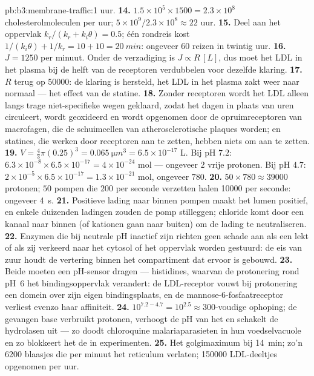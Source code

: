 \begin{solution}{pb:b3:membrane-traffic:1}
uur.
\textbf{14.} $1.5\times 10^{5}\times 1500 = 2.3\times 10^{8}$
cholesterolmoleculen per uur; $5\times 10^{9}/2.3\times 10^{8} \approx 22$ uur.
\textbf{15.} Deel aan het oppervlak $k_{r}/(k_{r} + k_{i}\theta) = 0.5$; één
rondreis kost $1/(k_{i}\theta) + 1/k_{r} = 10 + 10 = \qty{20}{min}$:
ongeveer $60$ reizen in twintig uur.
\textbf{16.} $J = 1250$ per minuut. Onder de verzadiging is $J \propto R\,[L]$,
dus moet het LDL in het plasma bij de helft van de receptoren
verdubbelen voor dezelfde klaring.
\textbf{17.} $R$ terug op \num{50000}: de klaring is hersteld, het LDL in
het plasma zakt weer naar normaal --- het effect van de statine.
\textbf{18.} Zonder receptoren wordt het LDL alleen langs trage
niet-specifieke wegen geklaard, zodat het dagen in plaats van uren
circuleert, wordt geoxideerd en wordt opgenomen door de
opruimreceptoren van macrofagen, die de schuimcellen van
atherosclerotische plaques worden; en statines, die werken door
receptoren aan te zetten, hebben niets om aan te zetten.
\textbf{19.} $V = \tfrac{4}{3}\pi(0.25)^{3} = \qty{0.065}{\micro m^3} =
6.5\times 10^{-17}$ L. Bij pH $7.2$: $6.3\times 10^{-8}\times 6.5\times
10^{-17} = 4\times 10^{-24}$ mol --- ongeveer $2$ vrije protonen. Bij pH $4.7$:
$2\times 10^{-5}\times 6.5\times 10^{-17} = 1.3\times 10^{-21}$ mol,
ongeveer $780$.
\textbf{20.} $50\times 780 \approx \num{39000}$ protonen; $50$ pompen die
$200$ per seconde verzetten halen \num{10000} per seconde: ongeveer
\qty{4}{s}.
\textbf{21.} Positieve lading naar binnen pompen maakt het lumen
positief, en enkele duizenden ladingen zouden de pomp stilleggen;
chloride komt door een kanaal naar binnen (of kationen gaan naar
buiten) om de lading te neutraliseren.
\textbf{22.} Enzymen die bij neutrale pH inactief zijn richten geen
schade aan als een  lekt of als zij verkeerd naar het cytosol
of het oppervlak worden gestuurd: de eis van zuur houdt de vertering
binnen het compartiment dat ervoor is gebouwd.
\textbf{23.} Beide moeten een pH-sensor dragen --- histidines, waarvan
de protonering rond pH~6 het bindingsoppervlak verandert: de
LDL-receptor vouwt bij protonering een domein over zijn eigen
bindingsplaats, en de mannose-6-fosfaatreceptor verliest evenzo haar
affiniteit.
\textbf{24.} $10^{7.2 - 4.7} = 10^{2.5} \approx 300$-voudige ophoping;
de gevangen base verbruikt protonen, verhoogt de pH van het  en
schakelt de hydrolasen uit --- zo doodt chloroquine malariaparasieten in
hun voedselvacuole en zo blokkeert het de  in experimenten.
\textbf{25.} Het golgimaximum bij \qty{14}{min}; zo'n \num{6200} blaasjes
die per minuut het reticulum verlaten; \num{150000} LDL-deeltjes
opgenomen per uur.
\end{solution}

